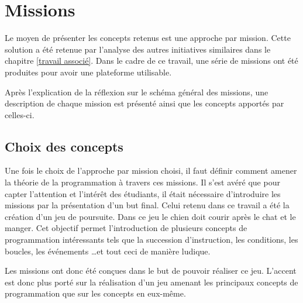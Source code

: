 \section{Missions}
\label{missions}
Le moyen de présenter les concepts retenus est une approche par mission. Cette solution a été retenue par l'analyse des autres initiatives similaires dans le chapitre \ref{travail associé}. Dans le cadre de ce travail, une série de missions ont été produites pour avoir une plateforme utilisable.

Après l'explication de la réflexion sur le schéma général des missions, une description de chaque mission est présenté ainsi que les concepts apportés par celles-ci.

\subsection{Choix des concepts}
Une fois le choix de l'approche par mission choisi, il faut définir comment amener la théorie de la programmation à travers ces missions. Il s'est avéré que pour capter l'attention et l'intérêt des étudiants, il était nécessaire d'introduire les missions par la présentation d'un but final. Celui retenu dans ce travail a été la création d'un jeu de poursuite. Dans ce jeu le chien doit courir après le chat et le manger. Cet objectif permet l'introduction de plusieurs concepts de programmation intéressants tels que la succession d'instruction, les conditions, les boucles, les événements \ldots et tout ceci de manière ludique.

Les missions ont donc été conçues dans le but de pouvoir réaliser ce jeu. L'accent est donc plus porté sur la réalisation d'un jeu amenant les principaux concepts de programmation que sur les concepts en eux-même. %


% 

